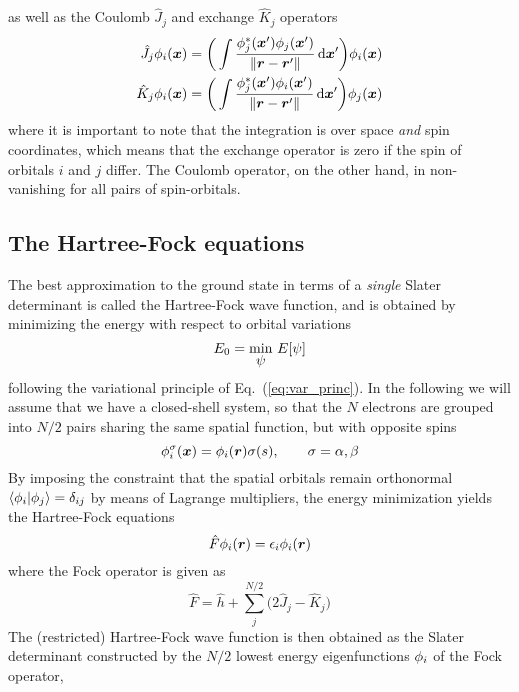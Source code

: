as well as the Coulomb $\hat{J}_j$ and exchange $\hat{K}_j$ operators
\begin{align}
    \hat{J}_j \phi_i(\boldsymbol x) &= \bigg(\int \frac{\phi_j^{\ast}(\boldsymbol x')\phi_j(\boldsymbol x')}
	{\|\boldsymbol r-\boldsymbol r'\|}\,\mathrm{d}\boldsymbol x'\bigg) \phi_i(\boldsymbol x)\\
    \hat{K}_j \phi_i(\boldsymbol x) &= \bigg(\int \frac{\phi_j^{\ast}(\boldsymbol x')\phi_i(\boldsymbol x')}
	{\|\boldsymbol r-\boldsymbol r'\|}\,\mathrm{d}\boldsymbol x'\bigg) \phi_j(\boldsymbol x)
\end{align}
where it is important to note that the integration is over space \emph{and} spin coordinates,
which means that the exchange operator is zero if the spin of orbitals $i$ and $j$ differ. 
The Coulomb operator, on the other hand, in non-vanishing for all pairs of spin-orbitals.

\subsection{The Hartree-Fock equations}
The best approximation to the ground state in terms of a \emph{single} Slater determinant is 
called the Hartree-Fock wave function, and is obtained by minimizing the energy with respect 
to orbital variations
\begin{equation}
    E_0 = \underset{\hbox{\ensuremath{\psi}}}{\text{min}}\ E[\psi]
\end{equation}
following the variational principle of Eq.~(\ref{eq:var_princ}). 
In the following we will assume that we have a closed-shell system, so that the $N$ electrons
are grouped into $N/2$ pairs sharing the same spatial function, but with opposite spins
\begin{equation}
    \phi_i^\sigma(\boldsymbol x) = \phi_i(\boldsymbol r)\sigma(s), \qquad \sigma = \alpha,\beta
\end{equation}
By imposing the constraint that the spatial orbitals remain orthonormal 
$\langle\phi_i|\phi_j\rangle = \delta_{ij}$
by means of Lagrange multipliers, the energy minimization yields the Hartree-Fock equations
\begin{equation}
    \hat{F}\phi_i(\boldsymbol r) = \epsilon_i \phi_i(\boldsymbol r)
\end{equation}
where the Fock operator is given as
\begin{equation}
    \hat{F} = \hat{h} + \sum_j^{N/2} \Big(2\hat{J}_j - \hat{K}_j\Big)
\end{equation}
The (restricted) Hartree-Fock wave function is then obtained as the Slater determinant 
constructed by the $N/2$ lowest energy eigenfunctions $\phi_i$ of the Fock operator, 
